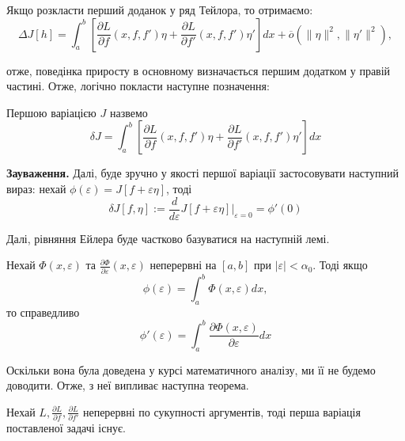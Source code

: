 \documentclass[14pt]{extarticle}
\newcommand{\<}{\langle}
\renewcommand{\>}{\rangle}
\theoremstyle{mystyle}{\newtheorem{definition}{Definition}[section]}
\theoremstyle{mystyle}{\newtheorem{proposition}[definition]{Proposition}}
\theoremstyle{mystyle}{\newtheorem{theorem}[definition]{Theorem}}
\theoremstyle{mystyle}{\newtheorem{lemma}[definition]{Lemma}}
\theoremstyle{mystyle}{\newtheorem{corollary}[definition]{Corollary}}
\theoremstyle{mystyle}{\newtheorem*{remark}{Remark}}
\theoremstyle{mystyle}{\newtheorem*{remarks}{Remarks}}
\theoremstyle{mystyle}{\newtheorem*{example}{Example}}
\theoremstyle{mystyle}{\newtheorem*{examples}{Examples}}
\theoremstyle{definition}{\newtheorem*{exercise}{Exercise}}
\theoremstyle{cstyle}{\newtheorem*{cthm}{}}
\theoremstyle{warn}
\begin{document}
Якщо розкласти перший доданок у ряд Тейлора, то отримаємо:
\begin{equation}
    \Delta J[h] = \int_a^b \left[\frac{\partial L}{\partial f}(x,f,f')\eta + \frac{\partial L}{\partial f'}(x,f,f')\eta'\right]dx + \overline{o}(\|\eta\|^2, \|\eta'\|^2),
\end{equation}

отже, поведінка приросту в основному визначається першим додатком у правій частині. Отже, логічно покласти наступне позначення:

\begin{definition} Першою варіацією $J$ назвемо
\begin{equation}
    \delta J = \int_a^b\left[\frac{\partial L}{\partial f}(x,f,f')\eta + \frac{\partial L}{\partial f'}(x,f,f')\eta'\right]dx
\end{equation}
\end{definition}

\begin{definition}
\textbf{Зауваження.} Далі, буде зручно у якості першої варіації застосовувати наступний вираз: нехай $\phi(\varepsilon) = J[f+\varepsilon\eta]$, тоді
\begin{equation}
    \delta J[f,\eta] := \frac{d}{d \varepsilon}J[f+\varepsilon \eta]\Big|_{\varepsilon =0} = \phi'(0)
\end{equation}
\end{definition}

Далі, рівняння Ейлера буде частково базуватися на наступній лемі.
\begin{lemma}
    Нехай $\Phi(x,\varepsilon)$ та $\frac{\partial \Phi}{\partial \varepsilon}(x,\varepsilon)$ неперервні на $[a,b]$ при $|\varepsilon|<\alpha_0$. Тоді якщо
    \begin{equation}
        \phi(\varepsilon) = \int_a^b \Phi(x,\varepsilon)dx,
    \end{equation}
    то справедливо 
    \begin{equation}
        \phi'(\varepsilon) = \int_a^b \frac{\partial\Phi(x,\varepsilon)}{\partial \varepsilon}dx
    \end{equation}
\end{lemma}

Оскільки вона була доведена у курсі математичного аналізу, ми її не будемо доводити. Отже, з неї випливає наступна теорема.

\begin{theorem}
    Нехай $L,\frac{\partial L}{\partial f}, \frac{\partial L}{\partial f'}$ неперервні по сукупності аргументів, тоді перша варіація поставленої задачі існує.
\end{theorem}
\end{document}
